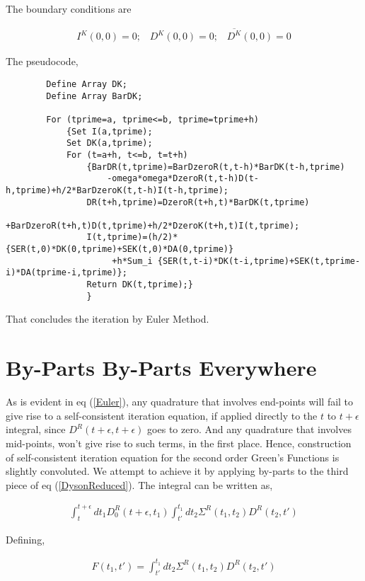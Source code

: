 \documentclass{amsart}
\begin{document}
    The boundary conditions are
    
    \begin{align}\label{BoundaryCondition2}
         I^K(0,0)=0; \;\;\; D^K(0,0)=0; \;\;\; \overline{D^K}(0,0)=0
    \end{align}
    
    The pseudocode,
    
    \begin{verbatim}
        Define Array DK;
        Define Array BarDK;
        
        For (tprime=a, tprime<=b, tprime=tprime+h)
        	{Set I(a,tprime);
        	Set DK(a,tprime);
        	For (t=a+h, t<=b, t=t+h)
        		{BarDR(t,tprime)=BarDzeroR(t,t-h)*BarDK(t-h,tprime)
        		    -omega*omega*DzeroR(t,t-h)D(t-h,tprime)+h/2*BarDzeroK(t,t-h)I(t-h,tprime);
        		DR(t+h,tprime)=DzeroR(t+h,t)*BarDK(t,tprime)
        		        +BarDzeroR(t+h,t)D(t,tprime)+h/2*DzeroK(t+h,t)I(t,tprime); 
        		I(t,tprime)=(h/2)*{SER(t,0)*DK(0,tprime)+SEK(t,0)*DA(0,tprime)}
        		     +h*Sum_i {SER(t,t-i)*DK(t-i,tprime)+SEK(t,tprime-i)*DA(tprime-i,tprime)};
                Return DK(t,tprime);}
        		}
    \end{verbatim}
    
    That concludes the iteration by Euler Method.
\section{By-Parts By-Parts Everywhere}

     As is evident in eq (\ref{Euler}), any quadrature that involves end-points will fail to give rise to a self-consistent iteration equation, if applied directly to the $t$ to $t+\epsilon$ integral, since $D^R(t+\epsilon,t+\epsilon)$ goes to zero. And any quadrature that involves mid-points, won't give rise to such terms, in the first place. Hence, construction of self-consistent iteration equation for the second order Green's Functions is slightly convoluted. We attempt to achieve it by applying by-parts to the third piece of eq (\ref{DysonReduced}). The integral can be written as,
     
     \begin{align}
         \int^{t+\epsilon}_{t} dt_1 D_0^R(t+\epsilon, t_1)\int^{t_1}_{t'} dt_2  \Sigma^R (t_1,t_2) D^R(t_2, t')
    \end{align}
    
    Defining,
    
    \begin{align}
              F(t_1,t') = \int^{t_1}_{t'} dt_2  \Sigma^R (t_1,t_2) D^R(t_2, t')
    \end{align}
    
\end{document}
